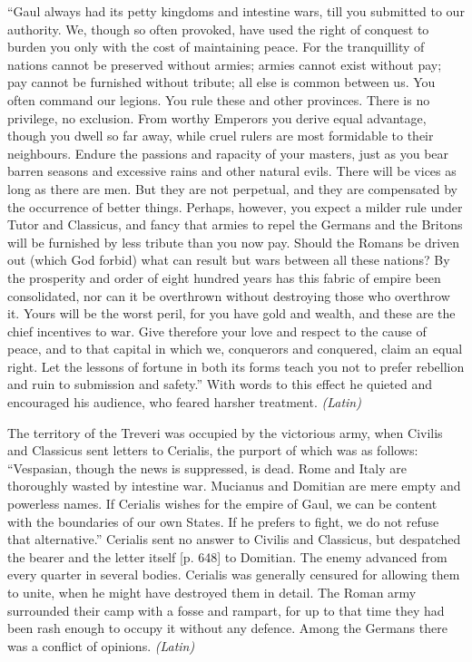 ``Gaul always had its petty kingdoms and intestine wars, till you submitted to our authority. We, though so often provoked, have used the right of conquest to burden you only with the cost of maintaining peace. For the tranquillity of nations cannot be preserved without armies; armies cannot exist without pay; pay cannot be furnished without tribute; all else is common between us. You often command our legions. You rule these and other provinces. There is no privilege, no exclusion. From worthy Emperors you derive equal advantage, though you dwell so far away, while cruel rulers are most formidable to their neighbours. Endure the passions and rapacity of your masters, just as you bear barren seasons and excessive rains and other natural evils. There will be vices as long as there are men. But they are not perpetual, and they are compensated by the occurrence of better things. Perhaps, however, you expect a milder rule under Tutor and Classicus, and fancy that armies to repel the Germans and the Britons will be furnished by less tribute than you now pay. Should the Romans be driven out (which God forbid) what can result but wars between all these nations? By the prosperity and order of eight hundred years has this fabric of empire been consolidated, nor can it be overthrown without destroying those who overthrow it. Yours will be the worst peril, for you have gold and wealth, and these are the chief incentives to war. Give therefore your love and respect to the cause of peace, and to that capital in which we, conquerors and conquered, claim an equal right. Let the lessons of fortune in both its forms teach you not to prefer rebellion and ruin to submission and safety.'' With words to this effect he quieted and encouraged his audience, who feared harsher treatment. \emph{(Latin)}


The territory of the Treveri was occupied by the victorious army, when Civilis and Classicus sent letters to Cerialis, the purport of which was as follows: ``Vespasian, though the news is suppressed, is dead. Rome and Italy are thoroughly wasted by intestine war. Mucianus and Domitian are mere empty and powerless names. If Cerialis wishes for the empire of Gaul, we can be content with the boundaries of our own States. If he prefers to fight, we do not refuse that alternative.'' Cerialis sent no answer to Civilis and Classicus, but despatched the bearer and the letter itself [p. 648] to Domitian. The enemy advanced from every quarter in several bodies. Cerialis was generally censured for allowing them to unite, when he might have destroyed them in detail. The Roman army surrounded their camp with a fosse and rampart, for up to that time they had been rash enough to occupy it without any defence. Among the Germans there was a conflict of opinions. \emph{(Latin)}

